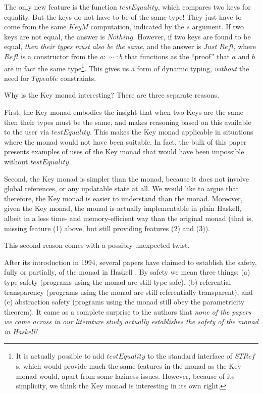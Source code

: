 \documentclass{sigplanconf}
\newcommand{\Conid}[1]{\mathit{#1}}
\newcommand{\Varid}[1]{\mathit{#1}}
\begin{document}
The only new feature is the function \ensuremath{\Varid{testEquality}}, which compares two keys for equality. But the keys do not have to be of the same type! They just have to come from the same \ensuremath{\Conid{KeyM}} computation, indicated by the \ensuremath{\Varid{s}} argument. If two keys are not equal, the answer is \ensuremath{\Conid{Nothing}}. However, if two keys are found to be equal, {\em then their types must also be the same}, and the answer is \ensuremath{\Conid{Just}\;\Conid{Refl}}, where \ensuremath{\Conid{Refl}} is a constructor from the \gadt{} \ensuremath{\Varid{a}:\sim:\Varid{b}} that functions as the ``proof'' that \ensuremath{\Varid{a}} and \ensuremath{\Varid{b}} are in fact the same type\footnote{It is actually possible to add \ensuremath{\Varid{testEquality}} to the standard interface of \ensuremath{\Conid{STRef}}s, which would provide much the same features in the \st{} monad as the Key monad would, apart from some laziness issues. However, because of its simplicity, we think the Key monad is interesting in its own right.}. This gives us a form of dynamic typing, \emph{without} the need for \ensuremath{\Conid{Typeable}} constraints.



Why is the Key monad interesting? There are three separate reasons.

First, the Key monad embodies the insight that when two Keys are the same then their types must be the same, and makes reasoning based on this available to the user via \ensuremath{\Varid{testEquality}}. This makes the Key monad applicable in situations where the \st{} monad would not have been suitable. In fact, the bulk of this paper presents examples of uses of the Key monad that would have been impossible without \ensuremath{\Varid{testEquality}}.

Second, the Key monad is simpler than the \st{} monad, because it does not involve global references, or any updatable state at all. We would like to argue that therefore, the Key monad is easier to understand than the \st{} monad. Moreover, given the Key monad, the \st{} monad is actually implementable in plain Haskell, albeit in a less time- and memory-efficient way than the original \st{} monad (that is, missing feature (1) above, but still providing features (2) and (3)).

This second reason comes with a possibly unexpected twist.

After its introduction in 1994, several papers have claimed to establish the safety, fully or partially, of the \st{} monad in Haskell \cite{stmonad,LaunchburySabry,AriolaSabry,MoggiSabry}. By safety we mean three things: (a) type safety (programs using the \st{} monad are still type safe), (b) referential transparency (programs using the \st{} monad are still referentially transparent), and (c) abstraction safety (programs using the \st{} monad still obey the parametricity theorem). It came as a complete surprise to the authors that {\em none of the papers we came across in our literature study actually establishes the safety of the \st{} monad in Haskell!}
\end{document}

